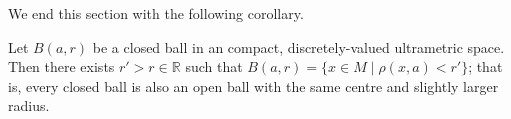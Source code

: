 


We end this section with the following corollary.\\
\begin{corollary}
\cite{ar} Let $B(a, r)$ be a closed ball in an compact, discretely-valued ultrametric space. Then there exists $ r' > r \in \mathbb{R}$ such that $B(a, r) = \{x \in M \mid \rho(x,a) < r'\} $; that is, every closed ball is also an open ball with the same centre and  slightly larger radius.
\end{corollary}




